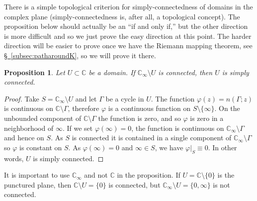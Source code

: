 \documentclass[12pt,openany]{book}
\newcommand{\C}{{\mathbb{C}}}
\newcommand{\myquote}[1]{``#1''}
\theoremstyle{plain}
\newtheorem{prop}[thm]{Proposition}
\theoremstyle{remark}
\theoremstyle{definition}
\theoremstyle{exercise}
\theoremstyle{example}
\newcommand{\subsectionref}[1]{\hyperref[#1]{\S~\ref*{#1}}}
\begin{document}
There is a simple topological criterion for
simply-connectedness of domains in the complex plane
(simply-connectedness is, after all, a topological concept).
The proposition below should actually be an \myquote{if and only if,} but the other
direction is more difficult and so we just prove the easy direction
at this point.
The harder direction will be easier to prove once we have the Riemann
mapping theorem, see \subsectionref{subsec:patharoundK}, so we will
prove it there.

\begin{prop} \label{prop:scbycomplementeasy}
Let $U \subset \C$ be a domain.  If
$\C_\infty \setminus U$ is connected, then $U$ is simply connected.
\end{prop}

\begin{proof}
Take $S = \C_\infty \setminus U$ and let $\Gamma$ be a cycle in $U$.
The function $\varphi(z)= n(\Gamma;z)$ is continuous on 
$\C \setminus \Gamma$,
therefore $\varphi$ is a continuous function on $S \setminus \{
\infty \}$.  On the unbounded component of $\C \setminus \Gamma$ the
function is zero, and so $\varphi$ is zero in a neighborhood of $\infty$.
If we set $\varphi(\infty) = 0$, the function is continuous
on $\C_\infty \setminus \Gamma$ and hence on $S$.  As $S$ is connected
it is contained in
a single component of $\C_\infty \setminus \Gamma$ so $\varphi$ is
constant on $S$.
As $\varphi(\infty) = 0$ and $\infty \in S$, we have $\varphi|_S \equiv 0$.
In other words, $U$ is simply connected.
\end{proof}

It is important to use $\C_\infty$ and not $\C$ in the proposition.
If $U = \C \setminus \{ 0 \}$ is the punctured plane, then
$\C \setminus U = \{ 0 \}$ is connected, but 
$\C_\infty \setminus U = \{ 0, \infty \}$ is not connected.
\end{document}
